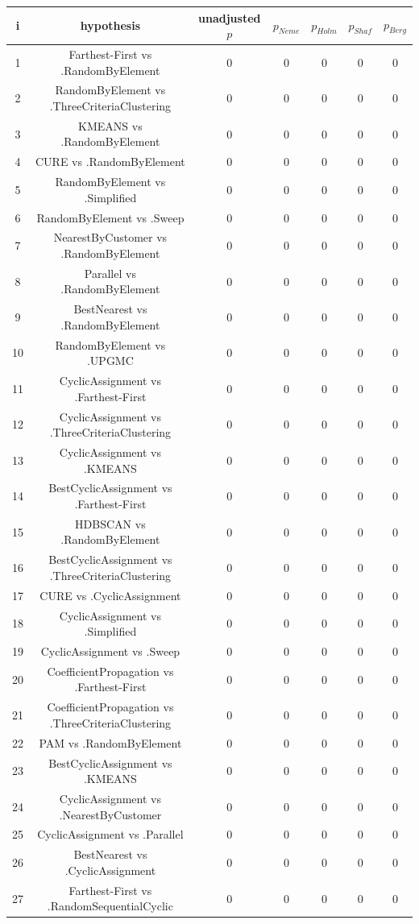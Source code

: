 \documentclass[a4paper,10pt]{article}
\begin{document}
\begin{landscape}
\begin{table}[!htp]
\centering\scriptsize
\begin{tabular}{ccccccc}
i&hypothesis&unadjusted $p$&$p_{Neme}$&$p_{Holm}$&$p_{Shaf}$&$p_{Berg}$\\
\hline1&Farthest-First vs .RandomByElement&0&0&0&0&0\\
2&RandomByElement vs .ThreeCriteriaClustering&0&0&0&0&0\\
3&KMEANS vs .RandomByElement&0&0&0&0&0\\
4&CURE vs .RandomByElement&0&0&0&0&0\\
5&RandomByElement vs .Simplified&0&0&0&0&0\\
6&RandomByElement vs .Sweep&0&0&0&0&0\\
7&NearestByCustomer vs .RandomByElement&0&0&0&0&0\\
8&Parallel vs .RandomByElement&0&0&0&0&0\\
9&BestNearest vs .RandomByElement&0&0&0&0&0\\
10&RandomByElement vs .UPGMC&0&0&0&0&0\\
11&CyclicAssignment vs .Farthest-First&0&0&0&0&0\\
12&CyclicAssignment vs .ThreeCriteriaClustering&0&0&0&0&0\\
13&CyclicAssignment vs .KMEANS&0&0&0&0&0\\
14&BestCyclicAssignment vs .Farthest-First&0&0&0&0&0\\
15&HDBSCAN vs .RandomByElement&0&0&0&0&0\\
16&BestCyclicAssignment vs .ThreeCriteriaClustering&0&0&0&0&0\\
17&CURE vs .CyclicAssignment&0&0&0&0&0\\
18&CyclicAssignment vs .Simplified&0&0&0&0&0\\
19&CyclicAssignment vs .Sweep&0&0&0&0&0\\
20&CoefficientPropagation vs .Farthest-First&0&0&0&0&0\\
21&CoefficientPropagation vs .ThreeCriteriaClustering&0&0&0&0&0\\
22&PAM vs .RandomByElement&0&0&0&0&0\\
23&BestCyclicAssignment vs .KMEANS&0&0&0&0&0\\
24&CyclicAssignment vs .NearestByCustomer&0&0&0&0&0\\
25&CyclicAssignment vs .Parallel&0&0&0&0&0\\
26&BestNearest vs .CyclicAssignment&0&0&0&0&0\\
27&Farthest-First vs .RandomSequentialCyclic&0&0&0&0&0\\

\end{tabular}
\end{table}
\end{landscape}
\end{document}
